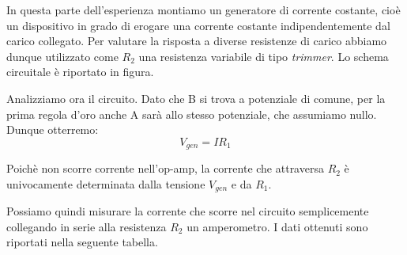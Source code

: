 In questa parte dell'esperienza montiamo un generatore di corrente costante, cioè un dispositivo in grado di erogare una corrente costante indipendentemente dal carico collegato. Per valutare la risposta a diverse resistenze di carico abbiamo dunque utilizzato come $R_2$ una resistenza variabile di tipo \textit{trimmer}. Lo schema circuitale è riportato in figura.



Analizziamo ora il circuito. Dato che B si trova a potenziale di comune, per la prima regola d'oro anche A sarà allo stesso potenziale, che assumiamo nullo. Dunque otterremo:
\begin{equation}
V_{gen}=I R_1
\label{eq:gen_1}
\end{equation}

Poichè non scorre corrente nell'op-amp, la corrente che attraversa $R_2$ è univocamente determinata dalla tensione $V_{gen}$ e da $R_1$.

Possiamo quindi misurare la corrente che scorre nel circuito semplicemente collegando in serie alla resistenza $R_2$ un amperometro. I dati ottenuti sono riportati nella seguente tabella.








